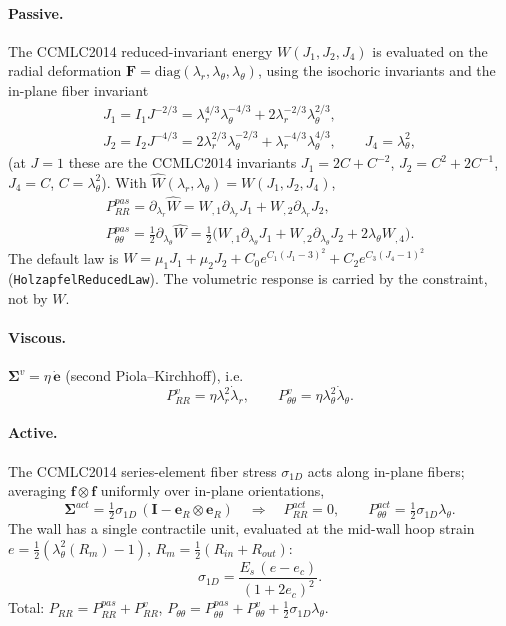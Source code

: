 \documentclass[11pt,a4paper]{article}
\newcommand{\bF}{\mathbf F}
\newcommand{\bI}{\mathbf I}
\newcommand{\be}{\mathbf e}
\newcommand{\Rin}{R_{in}}
\newcommand{\Rout}{R_{out}}
\newcommand{\lt}{\lambda_\theta}
\newcommand{\lr}{\lambda_r}
\newcommand{\sig}{\sigma_{1D}}
\newcommand{\code}[1]{\texttt{#1}}
\begin{document}
\paragraph{Passive.} The CCMLC2014 reduced-invariant energy $W(J_1,J_2,J_4)$ is evaluated on the radial deformation $\bF=\mathrm{diag}(\lr,\lt,\lt)$, using the isochoric invariants and the in-plane fiber invariant
\begin{equation}
\begin{gathered}
J_1=I_1J^{-2/3}=\lr^{4/3}\lt^{-4/3}+2\lr^{-2/3}\lt^{2/3},\\
J_2=I_2J^{-4/3}=2\lr^{2/3}\lt^{-2/3}+\lr^{-4/3}\lt^{4/3},\qquad J_4=\lt^2 ,
\end{gathered}
\end{equation}
(at $J=1$ these are the CCMLC2014 invariants $J_1=2C+C^{-2}$, $J_2=C^2+2C^{-1}$, $J_4=C$, $C=\lt^2$). With $\widehat W(\lr,\lt)=W(J_1,J_2,J_4)$,
\begin{equation}
\begin{gathered}
P_{RR}^{pas}=\partial_{\lr}\widehat W=W_{,1}\partial_{\lr}J_1+W_{,2}\partial_{\lr}J_2,\\
P_{\theta\theta}^{pas}=\tfrac12\partial_{\lt}\widehat W=\tfrac12\big(W_{,1}\partial_{\lt}J_1+W_{,2}\partial_{\lt}J_2+2\lt W_{,4}\big).
\end{gathered}
\end{equation}
The default law is $W=\mu_1J_1+\mu_2J_2+C_0e^{C_1(J_1-3)^2}+C_2e^{C_3(J_4-1)^2}$ (\code{HolzapfelReducedLaw}). The volumetric response is carried by the constraint, not by $W$.

\paragraph{Viscous.} $\bm\Sigma^{v}=\eta\,\dot{\mathbf e}$ (second Piola--Kirchhoff), i.e.
\begin{equation}
P_{RR}^{v}=\eta\lr^2\dot\lr,\qquad P_{\theta\theta}^{v}=\eta\lt^2\dot\lt .
\end{equation}

\paragraph{Active.} The CCMLC2014 series-element fiber stress $\sig$ acts along in-plane fibers; averaging $\mathbf f\otimes\mathbf f$ uniformly over in-plane orientations,
\begin{equation}
\bm\Sigma^{act}=\tfrac12\sig\,(\bI-\be_R\otimes\be_R)\quad\Longrightarrow\quad
P_{RR}^{act}=0,\qquad P_{\theta\theta}^{act}=\tfrac12\sig\lt .
\end{equation}
The wall has a single contractile unit, evaluated at the mid-wall hoop strain $e=\tfrac12(\lt^2(R_m)-1)$, $R_m=\tfrac12(\Rin+\Rout)$:
\begin{equation}
\sig=\frac{E_s\,(e-e_c)}{(1+2e_c)^2}.
\label{eq:sigma1d}
\end{equation}
Total: $P_{RR}=P^{pas}_{RR}+P^{v}_{RR}$, $P_{\theta\theta}=P^{pas}_{\theta\theta}+P^{v}_{\theta\theta}+\tfrac12\sig\lt$.
\end{document}
